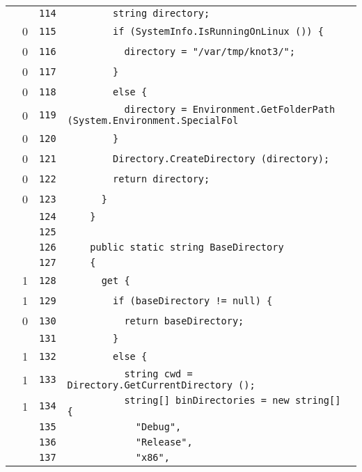 \documentclass[a4paper,10pt]{article}
\begin{document}
\begin{longtable}[l]{lrrl}
\cellcolor{gray} &  & \verb~114~ & \verb~        string directory;~\\
\cellcolor{red} & 0 & \verb~115~ & \verb~        if (SystemInfo.IsRunningOnLinux ()) {~\\
\cellcolor{red} & 0 & \verb~116~ & \verb~          directory = "/var/tmp/knot3/";~\\
\cellcolor{red} & 0 & \verb~117~ & \verb~        }~\\
\cellcolor{red} & 0 & \verb~118~ & \verb~        else {~\\
\cellcolor{red} & 0 & \verb~119~ & \verb~          directory = Environment.GetFolderPath (System.Environment.SpecialFol~\\
\cellcolor{red} & 0 & \verb~120~ & \verb~        }~\\
\cellcolor{red} & 0 & \verb~121~ & \verb~        Directory.CreateDirectory (directory);~\\
\cellcolor{red} & 0 & \verb~122~ & \verb~        return directory;~\\
\cellcolor{red} & 0 & \verb~123~ & \verb~      }~\\
\cellcolor{gray} &  & \verb~124~ & \verb~    }~\\
\cellcolor{gray} &  & \verb~125~ & \verb~~\\
\cellcolor{gray} &  & \verb~126~ & \verb~    public static string BaseDirectory~\\
\cellcolor{gray} &  & \verb~127~ & \verb~    {~\\
\cellcolor{green} & 1 & \verb~128~ & \verb~      get {~\\
\cellcolor{green} & 1 & \verb~129~ & \verb~        if (baseDirectory != null) {~\\
\cellcolor{red} & 0 & \verb~130~ & \verb~          return baseDirectory;~\\
\cellcolor{gray} &  & \verb~131~ & \verb~        }~\\
\cellcolor{green} & 1 & \verb~132~ & \verb~        else {~\\
\cellcolor{green} & 1 & \verb~133~ & \verb~          string cwd = Directory.GetCurrentDirectory ();~\\
\cellcolor{green} & 1 & \verb~134~ & \verb~          string[] binDirectories = new string[] {~\\
\cellcolor{gray} &  & \verb~135~ & \verb~            "Debug",~\\
\cellcolor{gray} &  & \verb~136~ & \verb~            "Release",~\\
\cellcolor{gray} &  & \verb~137~ & \verb~            "x86",~\\

\end{longtable}
\end{document}
